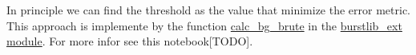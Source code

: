 In principle we can find the threshold as the value that minimize the error metric. This approach is implemente by the function \href{http://fretbursts.readthedocs.org/en/latest/plugins.html#fretbursts.burstlib_ext.calc_bg_brute}{calc\_bg\_brute} in the \href{http://fretbursts.readthedocs.org/en/latest/plugins.html}{burstlib\_ext module}. For more infor see this notebook[TODO].
